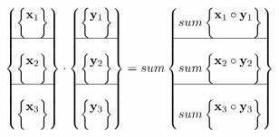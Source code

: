 \documentclass[sigplan,screen]{acmart}
\begin{document}
\begin{equation*}
\begin{Bmatrix}
\begin{Bmatrix}
\mathbf{x}_1\\
\\
\end{Bmatrix}\\
\hline\\
\begin{Bmatrix}
\mathbf{x}_2\\
\\
\end{Bmatrix}\\
\hline\\
\begin{Bmatrix}
\mathbf{x}_3\\
\\
\end{Bmatrix}	
\end{Bmatrix} \cdot 
\begin{Bmatrix}
\begin{Bmatrix}
\mathbf{y}_1\\
\\
\end{Bmatrix}\\
\hline\\
\begin{Bmatrix}
\mathbf{y}_2\\
\\
\end{Bmatrix}\\
\hline\\
\begin{Bmatrix}
\mathbf{y}_3\\
\\
\end{Bmatrix}	
\end{Bmatrix} = 
sum\begin{Bmatrix}
sum\begin{Bmatrix}
\mathbf{x}_1 \circ \mathbf{y}_1\\
\\
\end{Bmatrix}\\
\hline\\
sum\begin{Bmatrix}
\mathbf{x}_2 \circ \mathbf{y}_2\\
\\
\end{Bmatrix}\\
\hline\\
sum\begin{Bmatrix}
\mathbf{x}_3 \circ \mathbf{y}_3\\
\\
\end{Bmatrix}	
\end{Bmatrix}
\end{equation*}
\end{document}
